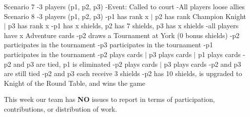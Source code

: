 \documentclass[12pt]{article} %
\begin{document}
Scenario 7
-3 players (p1, p2, p3)
-Event: Called to court
-All players loose allies\\

Scenario 8
-3 players (p1, p2, p3)
-p1 has rank x $|$ p2 has rank Champion Knight $|$ p3 has rank x
-p1 has x shields, p2 has 7 shields, p3 has x shields
-all players have x Adventure cards
-p2 draws a Tournament at York (0 bonus shields)
-p2 participates in the tournament
-p3 participates in the tournament
-p1 participates in the tournament
-p2 plays cards $|$ p3 plays cards $|$ p1 plays cards
-p2 and p3 are tied, p1 is eliminated
-p2 plays cards $|$ p3 plays cards
-p2 and p3 are still tied
-p2 and p3 each receive 3 shields
-p2 has 10 shields, is upgraded to Knight of the Round Table, and wins the game\\
\egroup

This week our team has \textbf{NO} issues to report in terms of participation, contributions, or distribution of work.




\end{document}
